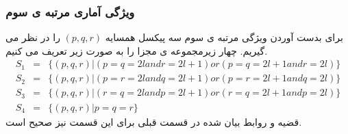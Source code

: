 \subsubsection{ویژگی آماری مرتبه ی سوم}
برای بدست آوردن ویژگی مرتبه ی سوم سه پیکسل همسایه $ (p,q,r) $ را در نظر می گیریم. چهار زیرمجموعه ی مجزا را به صورت زیر تعریف می کنیم.
\begin{eqnarray}
S_{1}&=&\lbrace (p,q,r)|(p=q=2l and r=2l+1) or (p=q=2l+1 and r=2l)\rbrace\nonumber\\
S_{2}&=&\lbrace (p,q,r)|(p=r=2l and q=2l+1) or (p=r=2l+1 and q=2l)\rbrace\nonumber\\
S_{3}&=&\lbrace (p,q,r)|(r=q=2l and p=2l+1) or (r=q=2l+1 and p=2l)\rbrace\nonumber\\
S_{4}&=&\lbrace (p,q,r)|p=q=r\rbrace
\end{eqnarray}
قضیه و روابط بیان شده در قسمت قبلی برای این قسمت نیز صحیح است.


